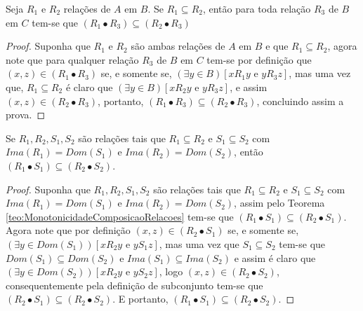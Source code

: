 \begin{theorem}\label{teo:MonotonicidadeComposicaoRelacoes}
	Seja $R_1$ e $R_2$ relações de $A$ em $B$. Se $R_1 \subseteq R_2$, então para toda relação $R_3$ de $B$ em $C$ tem-se que $(R_1 \bullet R_3) \subseteq (R_2 \bullet R_3)$
\end{theorem}

\begin{proof}
	Suponha que $R_1$ e $R_2$ são ambas relações de $A$ em $B$ e que $R_1 \subseteq R_2$, agora note que para qualquer relação $R_3$ de $B$ em $C$ tem-se por definição que $(x, z) \in (R_1 \bullet R_3)$ se, e somente se, $(\exists y \in B)[x\mathrel{R_1}y \text{ e } y\mathrel{R_3}z]$, mas uma vez que, $R_1 \subseteq R_2$ é claro que $ (\exists y \in B)[x \mathrel{R_2}y \text{ e } y\mathrel{R_3}z]$, e assim $(x, z) \in (R_2 \bullet R_3)$, portanto, $(R_1 \bullet R_3) \subseteq (R_2 \bullet R_3)$, concluindo assim a prova.
\end{proof}

\begin{corollary}\label{col:MonotonicidadeComposicaoRelacoes}
	Se $R_1, R_2, S_1, S_2$ são relações tais que $R_1 \subseteq R_2$ e $S_1 \subseteq S_2$ com $Ima(R_1) = Dom(S_1)$ e $Ima(R_2) = Dom(S_2)$, então $(R_1 \bullet S_1) \subseteq (R_2 \bullet S_2)$.
\end{corollary}

\begin{proof}
	Suponha que $R_1, R_2, S_1, S_2$ são relações tais que $R_1 \subseteq R_2$ e $S_1 \subseteq S_2$ com $Ima(R_1) = Dom(S_1)$ e $Ima(R_2) = Dom(S_2)$, assim pelo Teorema \ref{teo:MonotonicidadeComposicaoRelacoes} tem-se que $(R_1 \bullet S_1) \subseteq (R_2 \bullet S_1)$. Agora note que por definição $(x, z) \in (R_2 \bullet S_1)$ se, e somente se, $(\exists y \in Dom(S_1))[x\mathrel{R_2}y \text{ e } y\mathrel{S_1}z]$, mas uma vez que $S_1 \subseteq S_2$ tem-se que $Dom(S_1) \subseteq Dom(S_2)$ e $Ima(S_1) \subseteq Ima(S_2)$ e assim é claro que $(\exists y \in Dom(S_2))[x\mathrel{R_2}y \text{ e } y\mathrel{S_2}z]$, logo $(x, z) \in (R_2 \bullet S_2)$, consequentemente pela definição de subconjunto tem-se que $(R_2 \bullet S_1) \subseteq (R_2 \bullet S_2)$. E portanto, $(R_1 \bullet S_1) \subseteq (R_2 \bullet S_2)$.
\end{proof}


